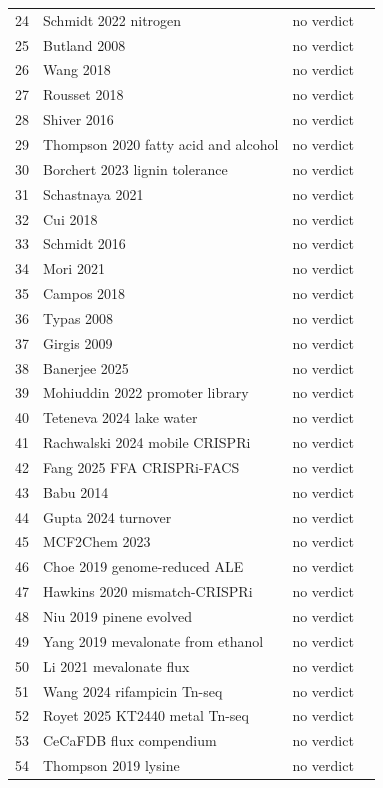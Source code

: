 \begin{longtable}{@{}r L{88mm} L{40mm} L{24mm}@{}}
24 & Schmidt 2022 nitrogen & no verdict &  \\
25 & Butland 2008 & no verdict &  \\
26 & Wang 2018 & no verdict &  \\
27 & Rousset 2018 & no verdict &  \\
28 & Shiver 2016 & no verdict &  \\
29 & Thompson 2020 fatty acid and alcohol & no verdict &  \\
30 & Borchert 2023 lignin tolerance & no verdict &  \\
31 & Schastnaya 2021 & no verdict &  \\
32 & Cui 2018 & no verdict &  \\
33 & Schmidt 2016 & no verdict &  \\
34 & Mori 2021 & no verdict &  \\
35 & Campos 2018 & no verdict &  \\
36 & Typas 2008 & no verdict &  \\
37 & Girgis 2009 & no verdict &  \\
38 & Banerjee 2025 & no verdict &  \\
39 & Mohiuddin 2022 promoter library & no verdict &  \\
40 & Teteneva 2024 lake water & no verdict &  \\
41 & Rachwalski 2024 mobile CRISPRi & no verdict &  \\
42 & Fang 2025 FFA CRISPRi-FACS & no verdict &  \\
43 & Babu 2014 & no verdict &  \\
44 & Gupta 2024 turnover & no verdict &  \\
45 & MCF2Chem 2023 & no verdict &  \\
46 & Choe 2019 genome-reduced ALE & no verdict &  \\
47 & Hawkins 2020 mismatch-CRISPRi & no verdict &  \\
48 & Niu 2019 pinene evolved & no verdict &  \\
49 & Yang 2019 mevalonate from ethanol & no verdict &  \\
50 & Li 2021 mevalonate flux & no verdict &  \\
51 & Wang 2024 rifampicin Tn-seq & no verdict &  \\
52 & Royet 2025 KT2440 metal Tn-seq & no verdict &  \\
53 & CeCaFDB flux compendium & no verdict &  \\
54 & Thompson 2019 lysine & no verdict &  \\

\end{longtable}
